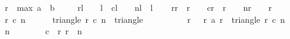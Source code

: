 \begin{isabellebody}
\ {\isacharquery}r\ {\isacharequal}\ {\isachardoublequoteopen}max\ {\isacharparenleft}a\ {}{}{}{}{\isacharparenright}\ {\isacharparenleft}b\ {}{}{}{}{\isacharparenright}{\isachardoublequoteclose}\isanewline
\ \ \isamarkupfalse%
\ {\isacharquery}r{}l\ {\isacharequal}\ {\isachardoublequoteopen}{}{}{}{}\ {\isacharminus}\ {\isacharquery}l{\isachardoublequoteclose}\ \ {\isacharquery}c{}l\ {\isacharequal}\ {}\ \ {\isacharquery}nl\ {\isacharequal}\ {\isachardoublequoteopen}{\isacharquery}l{\isachardoublequoteclose}\isanewline
\ \ \isamarkupfalse%
\ {\isacharquery}r{}r\ {\isacharequal}\ {\isachardoublequoteopen}{\isacharquery}r\ {\isacharplus}\ {}{\isachardoublequoteclose}\ \ {\isacharquery}c{}r\ {\isacharequal}\ {\isachardoublequoteopen}{\isacharquery}r\ {\isacharplus}\ {}{\isachardoublequoteclose}\ \ {\isacharquery}nr\ {\isacharequal}\ {\isachardoublequoteopen}{}{}{}{}\ {\isacharminus}\ {\isacharquery}r{\isachardoublequoteclose}\isanewline
\isanewline
\ \ \isacommand{{\isacharbraceleft}}\isamarkupfalse%
\isanewline
\ \ \ \ \isamarkupfalse%
\ r{}\ c{}\ n\isanewline
\ \ \ \ \isamarkupfalse%
\ {\isachardoublequoteopen}triangle\ r{}\ c{}\ n\ {\isasymsubseteq}\ triangle\ {}\ {}\ {}{}{}{}{\isachardoublequoteclose}\isanewline
\ \ \ \ \isamarkupfalse%
\ {\isachardoublequoteopen}{\isasymforall}\ r\ {\isacharless}\ {}{}{}{}{\isachardot}\ {\isacharparenleft}r{\isacharcomma}\ a\ r{\isacharparenright}\ {\isasymnotin}\ triangle\ r{}\ c{}\ n{\isachardoublequoteclose}\isanewline
\ \ \ \ \isamarkupfalse%
\ {\isachardoublequoteopen}n\ {\isasymge}\ {}{}{}{}{\isachardoublequoteclose}\isanewline
\ \ \ \ \isamarkupfalse%
\ {\isachardoublequoteopen}c{}\ {\isasymle}\ r{}{\isachardoublequoteclose}\ {\isachardoublequoteopen}r{}\ {\isacharplus}\ n\ {\isasymle}\ {}{}{}{}{\isachardoublequoteclose}\isanewline
\isanewline

\end{isabellebody}
